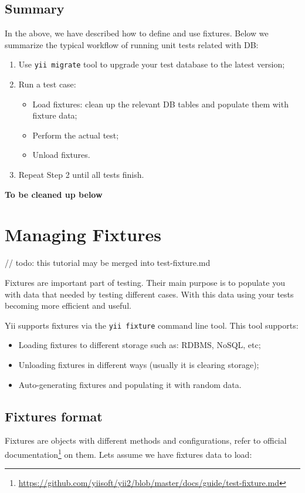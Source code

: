 \subsection{Summary}
In the above, we have described how to define and use fixtures. Below we summarize the typical workflow
of running unit tests related with DB:

\begin{enumerate}
\item Use \lstinline|yii migrate| tool to upgrade your test database to the latest version;
\item Run a test case:\begin{itemize}
\item Load fixtures: clean up the relevant DB tables and populate them with fixture data;
\item Perform the actual test;
\item Unload fixtures.
\end{itemize}

\item Repeat Step 2 until all tests finish.
\end{enumerate}
\textbf{To be cleaned up below}

\section{Managing Fixtures}
// todo: this tutorial may be merged into test-fixture.md

Fixtures are important part of testing. Their main purpose is to populate you with data that needed by testing
different cases. With this data using your tests becoming more efficient and useful.

Yii supports fixtures via the \lstinline|yii fixture| command line tool. This tool supports:

\begin{itemize}
\item Loading fixtures to different storage such as: RDBMS, NoSQL, etc;
\item Unloading fixtures in different ways (usually it is clearing storage);
\item Auto-generating fixtures and populating it with random data.
\end{itemize}
\subsection{Fixtures format}
Fixtures are objects with different methods and configurations, refer to official documentation\footnote{\url{https://github.com/yiisoft/yii2/blob/master/docs/guide/test-fixture.md}} on them.
Lets assume we have fixtures data to load:

